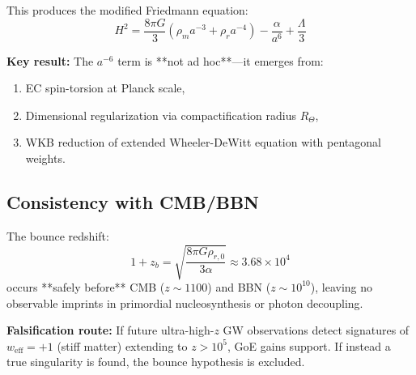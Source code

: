 \documentclass[12pt]{article}
\theoremstyle{definition}
\theoremstyle{plain}
\begin{document}
This produces the modified Friedmann equation:
\begin{equation}
H^2 = \frac{8\pi G}{3}\left(\rho_m a^{-3} + \rho_r a^{-4}\right) - \frac{\alpha}{a^6} + \frac{\Lambda}{3}
\end{equation}

\textbf{Key result:} The $a^{-6}$ term is **not ad hoc**—it emerges from:
\begin{enumerate}
\item EC spin-torsion at Planck scale,
\item Dimensional regularization via compactification radius $R_\Theta$,
\item WKB reduction of extended Wheeler-DeWitt equation with pentagonal weights.
\end{enumerate}

\subsection{Consistency with CMB/BBN}

The bounce redshift:
\begin{equation}
1 + z_b = \sqrt{\frac{8\pi G \rho_{r,0}}{3\alpha}} \approx 3.68 \times 10^4
\end{equation}
occurs **safely before** CMB ($z \sim 1100$) and BBN ($z \sim 10^{10}$), leaving no observable imprints in primordial nucleosynthesis or photon decoupling.

\textbf{Falsification route:} If future ultra-high-$z$ GW observations detect signatures of $w_{\text{eff}} = +1$ (stiff matter) extending to $z > 10^5$, GoE gains support. If instead a true singularity is found, the bounce hypothesis is excluded.



\end{document}
